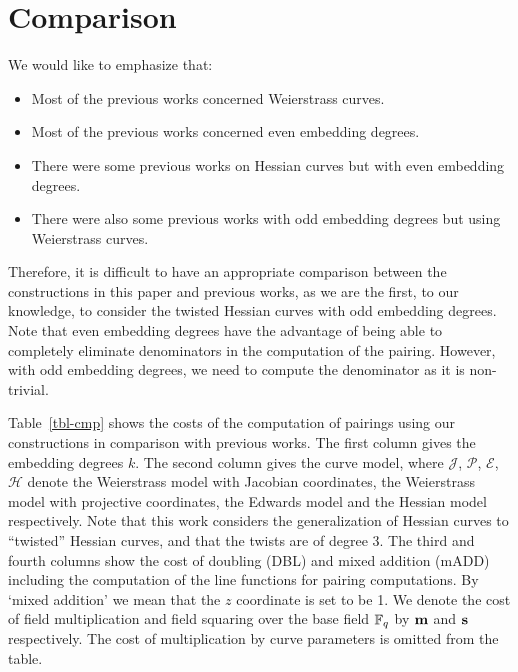 \section{Comparison}
\label{sec:cmp}

We would like to emphasize that:
\begin{itemize}
\item	Most of the previous works concerned Weierstrass curves.
\item	Most of the previous works concerned even embedding degrees.
\item	There were some previous works on Hessian curves but with even embedding degrees.
\item	There were also some previous works with odd embedding degrees but using Weierstrass curves.
\end{itemize}
Therefore, it is difficult to have an appropriate comparison between the constructions in this paper and previous works,
as we are the first, to our knowledge, to consider the twisted Hessian curves with odd embedding degrees.
Note that even embedding degrees have the advantage of being able to completely eliminate denominators in the computation of the pairing.
However, with odd embedding degrees, we need to compute the denominator as it is non-trivial.

Table~\ref{tbl-cmp} shows the costs of the computation of pairings using our constructions in comparison with previous works.
The first column gives the embedding degrees $k$.
The second column gives the curve model, where 
$\mathcal{J}$, $\mathcal{P}$, $\mathcal{E}$, $\mathcal{H}$ denote the
Weierstrass model with Jacobian coordinates, the
Weierstrass model with projective coordinates,
the Edwards model and the
Hessian model respectively.
Note that this work considers the generalization of Hessian curves to ``twisted'' Hessian curves, and that the twists are of degree 3.
The third and fourth columns show the cost of doubling (DBL) and mixed addition (mADD) including the computation of the line functions for pairing computations.
By `mixed addition' we mean that the $z$ coordinate is set to be 1.
We denote the cost of field multiplication and field squaring over the base field $\mathbb{F}_{q}$ by $\textbf{m}$ and $\textbf{s}$ respectively.
The cost of multiplication by curve parameters is omitted from the table.

